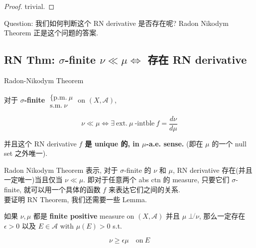 \documentclass{qlnotes-export}
\begin{document}
\begin{proof}

trivial.

\end{proof}

Question: 我们如何判断这个 RN derivative 是否存在呢? Radon Nikodym Theorem 正是这个问题的答案.

\subsection{\texorpdfstring{RN Thm: \(\sigma\)-finite \(\nu \ll \mu\Leftrightarrow\) 存在 RN derivative}{RN Thm: \textbackslash sigma-finite \textbackslash nu \textbackslash ll \textbackslash mu\textbackslash Leftrightarrow 存在 RN derivative}}\label{rn-thm-sigma-finite-nu-ll-muleftrightarrow-ux5b58ux5728-rn-derivative}

\begin{theorem}{Radon-Nikodym Theorem}\label{thm-11-radon-nikodym-theorem-radon-nikodym-theorem}

对于 \textbf{\(\sigma\)-finite} \(\begin{matrix}
{\{\text{p.m.}\ \mu} \\
{\text{s.m.}\ \nu}
\end{matrix}\) on \((X,\mathcal{A})\),

\[\nu \ll \mu\Leftrightarrow\exists\ \text{ext.}\ \mu\ \text{-intble}\ f = \frac{d\nu}{d\mu}\]

并且这个 RN derivative \textbf{\(f\) 是 \textbf{unique 的, in \(\mu\)-a.e. sense.}} (即在 \(\mu\) 的一个 null set 之外唯一).

\end{theorem}

Radon Nikodym Theorem 表示, 对于 \(\sigma\)-finite 的 \(\nu\) 和 \(\mu\), RN derivative 存在(并且一定唯一)当且仅当 \(\nu \ll \mu\). 即对于任意两个 abs ctn 的 measure, 只要它们 \(\sigma\)-finite, 就可以用一个具体的函数 \(f\) 来表达它们之间的关系.\\
要证明 RN Theorem, 我们还需要一些 Lemma.

\begin{lemma}\label{lem-11-radon-nikodym-theorem-lemma-001}

如果 \(\nu,\mu\) 都是 \textbf{finite positive} measure on \((X,\mathcal{A})\) 并且 \(\mu\operatorname{\perp\not{}}\nu\), 那么一定存在 \(\epsilon > 0\) 以及 \(E \in \mathcal{A}\) with \(\mu(E) > 0\) s.t.

\[\nu \geq \epsilon\mu\quad\text{on}\ E\]

\end{lemma}
\end{document}
